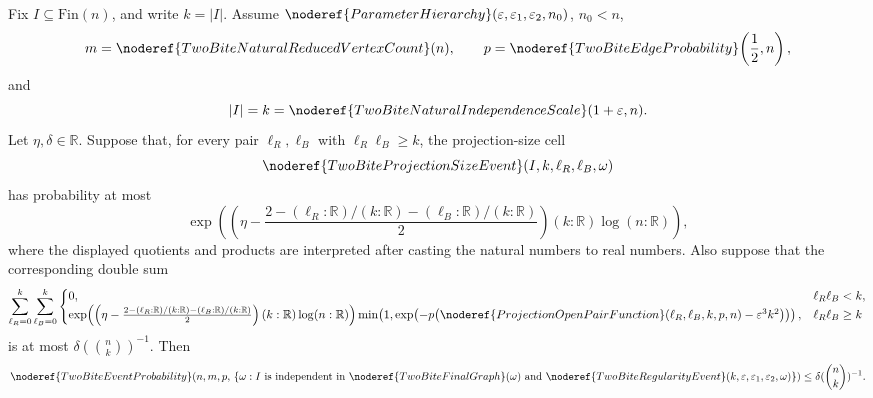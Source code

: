 \begin{helper}
Fix \(I\subseteq \mathrm{Fin}(n)\), and write \(k=|I|\).  Assume
\(\noderef{ParameterHierarchy}(\varepsilon,\varepsilon_1,\varepsilon_2,n_0)\),
\(n_0<n\),
\[
m=\noderef{TwoBiteNaturalReducedVertexCount}(n),\qquad
p=\noderef{TwoBiteEdgeProbability}\!\left(\frac12,n\right),
\]
and
\[
|I|=k=\noderef{TwoBiteNaturalIndependenceScale}(1+\varepsilon,n).
\]
Let \(\eta,\delta\in\mathbb R\).  Suppose that, for every pair
\(\ell_R,\ell_B\) with \(\ell_R\ell_B\ge k\), the projection-size cell
\[
\noderef{TwoBiteProjectionSizeEvent}(I,k,\ell_R,\ell_B,\omega)
\]
has probability at most
\[
\exp\!\left(
\left(\eta-\frac{2-(\ell_R:\mathbb R)/(k:\mathbb R)
-(\ell_B:\mathbb R)/(k:\mathbb R)}{2}\right)
(k:\mathbb R)\log(n:\mathbb R)\right),
\]
where the displayed quotients and products are interpreted after casting the
natural numbers to real numbers.  Also suppose that the corresponding double
sum
\[
\sum_{\ell_R=0}^{k}\sum_{\ell_B=0}^{k}
\begin{cases}
0,&\ell_R\ell_B<k,\\
\exp\!\left(
\left(\eta-\frac{2-(\ell_R:\mathbb R)/(k:\mathbb R)
-(\ell_B:\mathbb R)/(k:\mathbb R)}{2}\right)(k:\mathbb R)\log(n:\mathbb R)
\right)
\min\!\left(1,
\exp\!\left(-p\bigl(
\noderef{ProjectionOpenPairFunction}(\ell_R,\ell_B,k,p,n)
-\varepsilon^3 k^2\bigr)\right)\right),
&\ell_R\ell_B\ge k
\end{cases}
\]
is at most \(\delta(\binom nk)^{-1}\).  Then
\[
\noderef{TwoBiteEventProbability}\!\left(n,m,p,\,
\{\omega:
I\text{ is independent in }\noderef{TwoBiteFinalGraph}(\omega)
\text{ and }
\noderef{TwoBiteRegularityEvent}(k,\varepsilon,\varepsilon_1,\varepsilon_2,\omega)
\}\right)
\le \delta(\binom nk)^{-1}.
\]
\end{helper}

